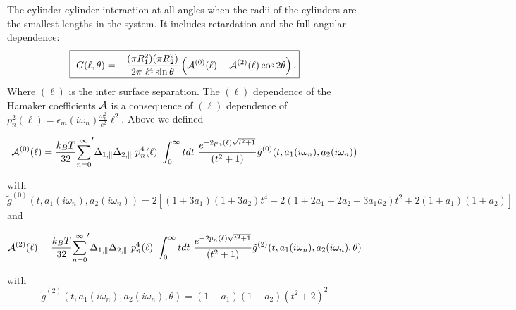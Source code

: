 \documentclass[onecolumn,letterpaper,amsmath,amssymb,floatfix,aps,superscriptaddress]{revtex4}
\begin{document}
The cylinder-cylinder interaction at all angles when the radii of the cylinders are the smallest lengths in the system. It includes retardation and the full angular dependence:
\begin{equation}
  \fbox{
    $\displaystyle{
G(\ell,\theta) = - \frac{ (\pi R_1^{2})(\pi R_2^{2}) }{2 \pi~\ell^{4} \sin{\theta}} \left( {\cal A}^{(0)}(\ell) + {\cal A}^{(2)}(\ell) \cos 2\theta \right) ,}$}
\label{pars-31a}
\end{equation}
Where $(\ell)$  is the inter surface separation. The $(\ell)$ dependence of the Hamaker coefficients $\cal A$ is a consequence of $(\ell)$ dependence of $p_n^{2}(\ell) =  \epsilon_m(i \omega_n) \frac{\omega_n^{2}}{c^{2}} \ell^{2}$. Above we defined
\begin{widetext}
\begin{equation}
{\cal A}^{(0)}(\ell) = \frac{k_BT}{32}  {\sum_{n=0}^{\infty}}' \Delta_{1,\parallel} \Delta_{2,\parallel} ~p_n^{4}(\ell) ~\int_0^{\infty} t dt ~\frac{e^{- 2 p_n(\ell) \sqrt{t^{2} + 1}}}{(t^{2} + 1)} \tilde g^{(0)}(t, a_1(i \omega_n), a_2(i \omega_n))
\label{eq:a0}
\end{equation}
\end{widetext}
with
\begin{equation}
\tilde g^{(0)}(t, a_1(i \omega_n), a_2(i \omega_n)) = 2 \left[ (1+3a_1)(1+3a_2) t^{4} + 2 (1+2a_1+2a_2+3a_1a_2) t^{2}  + 2(1+a_1)(1+a_2)\right]
\end{equation}
and
\begin{widetext}
\begin{equation}
{\cal A}^{(2)}(\ell) = \frac{k_BT}{32}  {\sum_{n=0}^{\infty}}' \Delta_{1,\parallel} \Delta_{2,\parallel} ~p_n^{4}(\ell) ~\int_0^{\infty} t dt ~\frac{e^{- 2 p_n(\ell) \sqrt{t^{2} + 1}}}{(t^{2} + 1)} \tilde g^{(2)}(t, a_1(i \omega_n), a_2(i \omega_n), \theta)
\end{equation}
\end{widetext}
with
\begin{equation}<C-LeftRelease>
\tilde g^{(2)}(t, a_1(i \omega_n), a_2(i \omega_n), \theta) = (1-a_1)(1-a_2)(t^{2} + 2)^2
\label{befgqw}
\end{equation}
\end{document}
